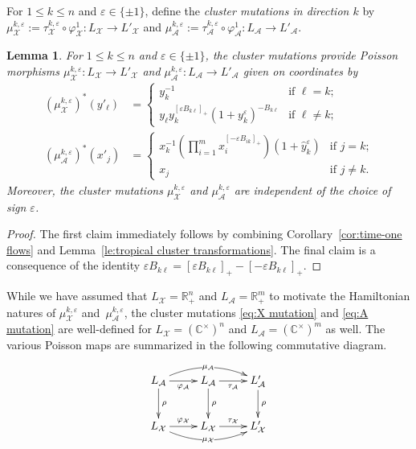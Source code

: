 \documentclass{amsart}
\newtheorem{lemma}[theorem]{Lemma}
\numberwithin{equation}{section}
\newcommand{\cA}{\mathcal{A}}
\newcommand{\cX}{\mathcal{X}}
\newcommand{\CC}{\mathbb{C}}
\newcommand{\RR}{\mathbb{R}}
\begin{document}
For $1\le k\le n$ and $\varepsilon\in\{\pm1\}$, define the \emph{cluster mutations in direction $k$} by $\mu_\cX^{k,\varepsilon}:=\tau_\cX^{k,\varepsilon}\circ\varphi_\cX^1:L_\cX\to L'_\cX$ and $\mu_\cA^{k,\varepsilon}:=\tau_\cA^{k,\varepsilon}\circ\varphi_\cA^1:L_\cA\to L'_\cA$.
\begin{lemma}
  \label{le:cluster mutation}
  For $1\le k\le n$ and $\varepsilon\in\{\pm1\}$, the cluster mutations provide Poisson morphisms $\mu_\cX^{k,\varepsilon}:L_\cX\to L'_\cX$ and $\mu_\cA^{k,\varepsilon}:L_\cA\to L'_\cA$ given on coordinates by
  \begin{align}
    \label{eq:X mutation}
    (\mu_\cX^{k,\varepsilon})^*(y'_\ell)&=\begin{cases} y_k^{-1} & \text{if $\ell=k$;}\\ y_\ell y_k^{[\varepsilon B_{k\ell}]_+}(1+y_k^\varepsilon)^{-B_{k\ell}} & \text{if $\ell\ne k$;}\end{cases}\\
    \label{eq:A mutation}
    (\mu_\cA^{k,\varepsilon})^*(x'_j)&=\begin{cases} x_k^{-1}\left(\prod\limits_{i=1}^m x_i^{[-\varepsilon B_{ik}]_+}\right)(1+\hat y_k^\varepsilon) & \text{if $j=k$;}\\ x_j & \text{if $j\ne k$.}\end{cases}
  \end{align}
  Moreover, the cluster mutations $\mu_\cX^{k,\varepsilon}$ and $\mu_\cA^{k,\varepsilon}$ are independent of the choice of sign $\varepsilon$.
\end{lemma}
\begin{proof}
  The first claim immediately follows by combining Corollary~\ref{cor:time-one flows} and Lemma~\ref{le:tropical cluster transformations}.
  The final claim is a consequence of the identity $\varepsilon B_{k\ell}=[\varepsilon B_{k\ell}]_+-[-\varepsilon B_{k\ell}]_+$.
\end{proof}

While we have assumed that $L_\cX=\RR_+^n$ and $L_\cA=\RR_+^m$ to motivate the Hamiltonian natures of $\mu_\cX^{k,\varepsilon}$ and~$\mu_\cA^{k,\varepsilon}$, the cluster mutations \eqref{eq:X mutation} and \eqref{eq:A mutation} are well-defined for $L_\cX= (\CC^\times)^n$ and $L_\cA= (\CC^\times)^m$ as well. The various Poisson maps are summarized in the following commutative diagram.

\begin{equation} 
  \label{eq:PoisCD}
  \xymatrix{
    L_\cA \ar[d]^{\rho} \ar[r]_{\varphi_\cA} \ar@/^1pc/[rr]|-{\mu_\cA} & L_\cA \ar[d]^{\rho} \ar[r]_{\tau_\cA} & L'_\cA \ar[d]^{\rho} \\
    L_\cX \ar[r]^{\varphi_\cX} \ar@/_1pc/[rr]|-{\mu_\cX} & L_\cX \ar[r]^{\tau_\cX} & L'_\cX
  }
\end{equation}
\end{document}
